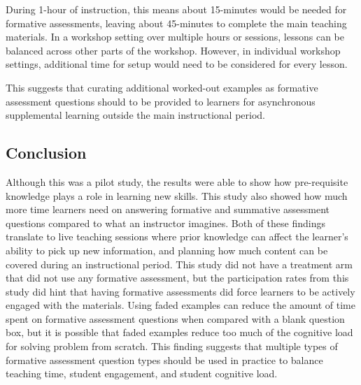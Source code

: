 \documentclass[040-assessment.tex]{subfiles}
\begin{document}
    During 1-hour of instruction, this means about 15-minutes would be needed for formative assessments,
    leaving about 45-minutes to complete the main teaching materials.
    In a workshop setting over multiple hours or sessions, lessons can be balanced across other parts of the workshop.
    However, in individual workshop settings, additional time for setup would need to be
    considered for every lesson.

    This suggests that curating additional worked-out examples as formative assessment questions
    should to be provided to learners
    for asynchronous supplemental learning outside the main instructional period.

\subsection{Conclusion}

    Although this was a pilot study, the results were able to show how pre-requisite knowledge plays a
    role in learning new skills.
    This study also showed how much more time learners need on answering formative and summative assessment questions compared to what an instructor imagines.
    Both of these findings translate to live teaching sessions where prior knowledge can affect the learner's ability to pick up new information,
    and planning how much content can be covered during an instructional period.
    This study did not have a treatment arm that did not use any formative assessment,
    but the participation rates from this study did hint that having formative assessments did force learners to be actively engaged with
    the materials.
    Using faded examples can reduce the amount of time spent on formative assessment questions when compared with a blank question box,
    but it is possible that faded examples reduce too much of the cognitive load for solving problem from scratch.
    This finding suggests that multiple types of formative assessment question types should be used in practice to balance
    teaching time, student engagement, and student cognitive load.
\end{document}
